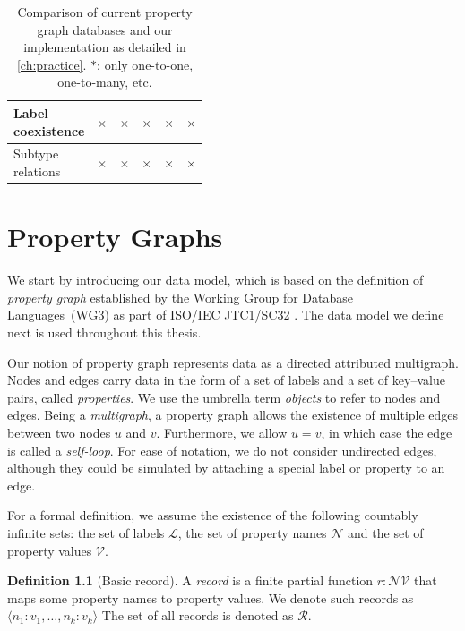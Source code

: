 \documentclass{report}
\makeatletter
\theoremstyle{definition}
\newtheorem{definition}{Definition}
\newcommand{\pto}{}%
\DeclareRobustCommand{\pto}{\mathrel{\mathpalette\p@to@gets\to}}
\newcommand{\p@to@gets}[2]{%
  \ooalign{\hidewidth$\m@th#1\mapstochar\mkern5mu$\hidewidth\cr$\m@th#1\to$\cr}%
}
\newcommand{\no}{\cellcolor{lightred}\color{red}$\times$}
\makeatother
\begin{document}
\begin{table}[t]
\begin{tabular}{lccccc}
    \hline
    \makecell[l]{Label                                                                                         \\coexistence} & \no                & \no                 & \no                 & \no                 & \no            \\
    \hline
    \makecell[l]{Subtype                                                                                       \\relations} & \no                & \no                 & \no                 & \no                 & \no           \\
    \hline
  \end{tabular}
  \caption[Comparison of current property graph databases and our implementation]{Comparison of current property graph databases and our implementation as detailed in \autoref{ch:practice}. $*$: only one-to-one, one-to-many, etc.}
  \label{tab:pg-schema-databases}
\end{table}

\chapter{Property Graphs}
\label{ch:data-model}

We start by introducing our data model, which is based on the definition of \emph{property graph} established by the Working Group for Database Languages~(WG3) as part of ISO/IEC JTC1/SC32 \citep{deutsch2021gpml}. The data model we define next is used throughout this thesis.

Our notion of property graph represents data as a directed attributed multigraph. Nodes and edges carry data in the form of a set of labels and a set of key--value pairs, called \emph{properties}. We use the umbrella term \emph{objects} to refer to nodes and edges. Being a \emph{multigraph}, a property graph allows the existence of multiple edges between two nodes $u$ and $v$. Furthermore, we allow $u = v$, in which case the edge is called a \emph{self-loop}. For ease of notation, we do not consider undirected edges, although they could be simulated by attaching a special label or property to an edge.

For a formal definition, we assume the existence of the following countably infinite sets: the set of labels $\mathcal{L}$, the set of property names $\mathcal{N}$ and the set of property values $\mathcal{V}$.

\begin{definition}[Basic record]
  \label{def:record-basic}
  A \emph{record} is a finite partial function $r : \mathcal{N} \pto \mathcal{V}$ that maps some property names to property values. We denote such records as $\langle n_1 : v_1, \ldots, n_k : v_k \rangle$ The set of all records is denoted as $\mathcal{R}$.
\end{definition}
\end{document}
